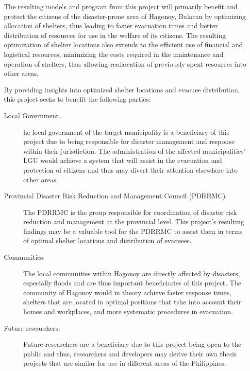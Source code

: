 	The resulting models and program from this project will primarily benefit and protect the citizens of the disaster-prone area of Hagonoy, Bulacan by optimizing allocation of shelters, thus leading to faster evacuation times and better distribution of resources for use in the welfare of its citizens. The resulting optimization of shelter locations also extends to the efficient use of financial and logistical resources, minimizing the costs required in the maintenance and operation of shelters, thus allowing reallocation of previously spent resources into other areas.
	
	By providing insights into optimized shelter locations and evacuee distribution, this project seeks to benefit the following parties:
	
	\begin{description}
		\item[Local Government.] he local government of the target municipality is a beneficiary of this project due to being responsible for disaster management and response within their jurisdiction. The administration of the affected municipalities’ LGU would achieve a system that will assist in the evacuation and protection of citizens and thus may divert their attention elsewhere into other areas.
		
		\item[Provincial Disaster Risk Reduction and Management Council (PDRRMC).] The PDRRMC is the group responsible for coordination of disaster risk reduction and management at the provincial level. This project’s resulting findings may be a valuable tool for the PDRRMC to assist them in terms of optimal shelter locations and distribution of evacuees.
		
		\item[Communities.] The local communities within Hagonoy are directly affected by disasters, especially floods and are thus important beneficiaries of this project. The community of Hagonoy would in theory achieve faster response times, shelters that are located in optimal positions that take into account their homes and workplaces, and more systematic procedures in evacuation.
		
		\item[Future researchers.] Future researchers are a beneficiary due to this project being open to the public and thus, researchers and developers may derive their own thesis projects that are similar for use in different areas of the Philippines.
		
	\end{description}

